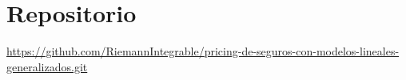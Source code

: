 \section*{Repositorio}

\url{https://github.com/RiemannIntegrable/pricing-de-seguros-con-modelos-lineales-generalizados.git}